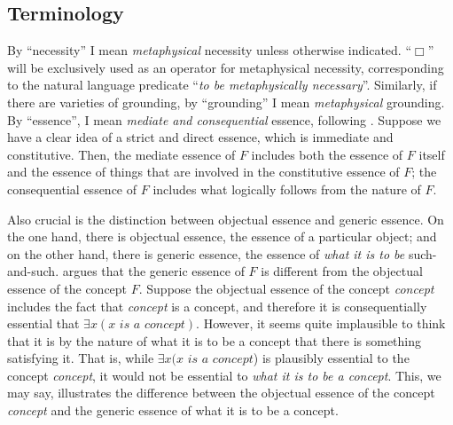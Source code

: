 \documentclass[12pt]{article}
\begin{document}
\subsection{Terminology}
By ``necessity'' I mean \textit{metaphysical} necessity unless otherwise indicated. ``$\Box$'' will be exclusively used as an operator for metaphysical necessity, corresponding to the natural language predicate ``\textit{to be metaphysically necessary}''. Similarly, if there are varieties of grounding, by ``grounding'' I mean \textit{metaphysical} grounding. By ``essence'', I mean \textit{mediate and consequential} essence, following \citet{Fine1995-FINTLO,Fine1995-FINSOE}. Suppose we have a clear idea of a strict and direct essence, which is immediate and constitutive. Then, the mediate essence of $F$ includes both the essence of $F$ itself and the essence of things that are involved in the constitutive essence of $F$; the consequential essence of $F$ includes what logically follows from the nature of $F$. 
\par
Also crucial is the distinction between objectual essence and generic essence. On the one hand, there is objectual essence, the essence of a particular object; and on the other hand, there is generic essence, the essence of \textit{what it is to be} such-and-such. \citet{Fine2015-FINUFF} argues that the generic essence of $F$ is different from the objectual essence of the concept $F$. Suppose the objectual essence of the concept \textit{concept} includes the fact that \textit{concept} is a concept, and therefore it is consequentially essential that $\exists x (x \textit{ is a concept})$. However, it seems quite implausible to think that it is by the nature of what it is to be a concept that there is something satisfying it. That is, while $\exists x (x \textit{ is a concept}$) is plausibly essential to the concept \textit{concept}, it would not be essential to \textit{what it is to be a concept}. This, we may say, illustrates the difference between the objectual essence of the concept \textit{concept} and the generic essence of what it is to be a concept.
\par
\end{document}
